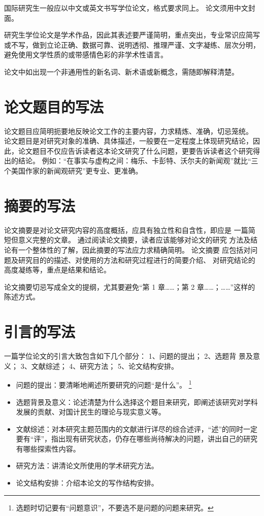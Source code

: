国际研究生一般应以中文或英文书写学位论文，格式要求同上。
论文须用中文封面。

研究生学位论文是学术作品，因此其表述要严谨简明，重点突出，专业常识应简写或不写，做到立论正确、数据可靠、说明透彻、推理严谨、文字凝练、层次分明，避免使用文学性质的或带感情色彩的非学术性语言。

论文中如出现一个非通用性的新名词、新术语或新概念，需随即解释清楚。


\section{论文题目的写法}

论文题目应简明扼要地反映论文工作的主要内容，力求精炼、准确，切忌笼统。
论文题目是对研究对象的准确、具体描述，一般要在一定程度上体现研究结论，因此，论文题目不仅应告诉读者这本论文研究了什么问题，更要告诉读者这个研究得出的结论。
例如：“在事实与虚构之间：梅乐、卡彭特、沃尔夫的新闻观”就比“三个美国作家的新闻观研究”更专业、更准确。



\section{摘要的写法}

论文摘要是对论文研究内容的高度概括，应具有独立性和自含性，即应是 一篇简短但意义完整的文章。
通过阅读论文摘要，读者应该能够对论文的研究 方法及结论有一个整体性的了解，因此摘要的写法应力求精确简明。
论文摘要 应包括对问题及研究目的的描述、对使用的方法和研究过程进行的简要介绍、 对研究结论的高度凝练等，重点是结果和结论。

论文摘要切忌写成全文的提纲，尤其要避免“第 1 章……；第 2 章……；……”这样的陈述方式。



\section{引言的写法}

一篇学位论文的引言大致包含如下几个部分：
1、问题的提出；
2、选题背 景及意义；
3、文献综述；
4、研究方法；
5、论文结构安排。
\begin{itemize}
  \item 问题的提出：要清晰地阐述所要研究的问题“是什么”。
    \footnote{选题时切记要有“问题意识”，不要选不是问题的问题来研究。}
  \item 选题背景及意义：论述清楚为什么选择这个题目来研究，即阐述该研究对学科发展的贡献、对国计民生的理论与现实意义等。
  \item 文献综述：对本研究主题范围内的文献进行详尽的综合述评，“述”的同时一定要有“评”，指出现有研究状态，仍存在哪些尚待解决的问题，讲出自己的研究有哪些探索性内容。
  \item 研究方法：讲清论文所使用的学术研究方法。
  \item 论文结构安排：介绍本论文的写作结构安排。
\end{itemize}



